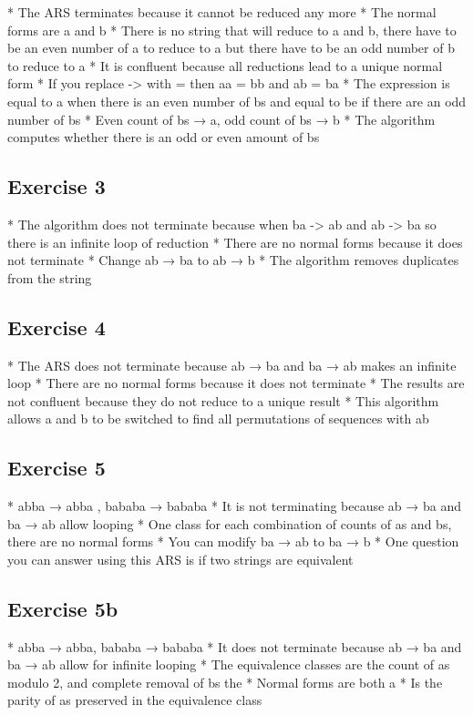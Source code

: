 \documentclass{article}
\theoremstyle{plain}
\theoremstyle{definition}
\theoremstyle{remark}
\begin{document}
* The ARS terminates because it cannot be reduced any more
* The normal forms are a and b
* There is no string that will reduce to a and b, there have to be an even number of a to reduce to a but there have to be an odd number of b to reduce to a
* It is confluent because all reductions lead to a unique normal form
* If you replace -> with = then aa = bb and ab = ba
* The expression is equal to a when there is an even number of bs and equal to be if there are an odd number of bs
* Even count of bs → a, odd count of bs → b
* The algorithm computes whether there is an odd or even amount of bs

\subsection{Exercise 3}

* The algorithm does not terminate because when ba -> ab and ab -> ba so there is an infinite loop of reduction
* There are no normal forms because it does not terminate
* Change ab → ba to ab → b
* The algorithm removes duplicates from the string

\subsection{Exercise 4}

* The ARS does not terminate because ab → ba and ba → ab makes an infinite loop
* There are no normal forms because it does not terminate
* The results are not confluent because they do not reduce to a unique result
* This algorithm allows a and b to be switched to find all permutations of sequences with ab

\subsection{Exercise 5}

* abba → abba , bababa → bababa
* It is not terminating because ab → ba and ba → ab allow looping
* One class for each combination of counts of as and bs, there are no normal forms
* You can modify ba → ab to ba → b
* One question you can answer using this ARS is if two strings are equivalent 

\subsection{Exercise 5b}

* abba → abba, bababa → bababa
* It does not terminate because ab → ba and ba → ab allow for infinite looping
* The equivalence classes are the count of as modulo 2, and complete removal of bs the 
* Normal forms are both a
* Is the parity of as preserved in the equivalence class
\end{document}
